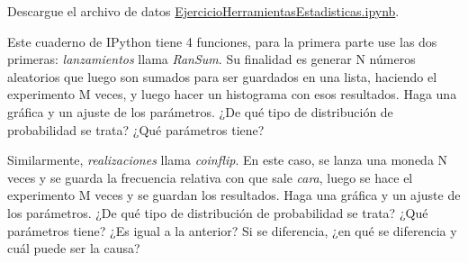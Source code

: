 \documentclass[11pt,letterpaper]{exam}
\begin{document}
\begin{questions}


Descargue el archivo de datos 
\href{https://github.com/ComputoCienciasUniandes/HerramientasComputacionales/blob/master/Lectures/98.Python/EjercicioHerramientasEstadisticas.ipynb}{EjercicioHerramientasEstadisticas.ipynb}.

Este cuaderno de IPython tiene 4 funciones, para la primera parte use las dos primeras: \textit{lanzamientos} llama \textit{RanSum}. Su finalidad es generar N números aleatorios que luego son sumados para ser guardados en una lista, haciendo el experimento M veces, y luego hacer un histograma con esos resultados. Haga una gráfica y un ajuste de los parámetros. ¿De qué tipo de distribución de probabilidad se trata? ¿Qué parámetros tiene?


Similarmente, \textit{realizaciones} llama \textit{coinflip}. En este caso, se lanza una moneda N veces y se guarda la frecuencia relativa con que sale \textit{cara}, luego se hace el experimento M veces y se guardan los resultados. Haga una gráfica y un ajuste de los parámetros. ¿De qué tipo de distribución de probabilidad se trata? ¿Qué parámetros tiene? ¿Es igual a la anterior? Si se diferencia, ¿en qué se diferencia y cuál puede ser la causa?

\end{questions}
\end{document}
